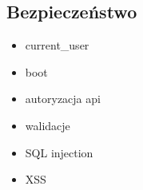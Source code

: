 \begin{itemize}
      \end{itemize}
  \subsection{Bezpieczeństwo}
    \begin{itemize}
      \item current\_user
      \item boot
      \item autoryzacja api
      \item walidacje
      \item SQL injection
      \item XSS
    \end{itemize}

